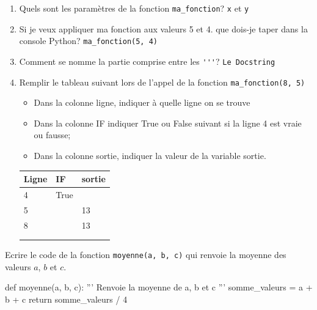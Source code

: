 \documentclass[a4paper,10pt]{report}
\def\ptsexoB{2}
\begin{document}
\begin{enumerate}
    \item Quels sont les paramètres de la fonction \verb|ma_fonction|? \dotfill \verb|x| et \verb|y|
    \item Si je veux appliquer ma fonction aux valeurs 5 et 4. que dois-je taper dans la console Python? \dotfill \verb|ma_fonction(5, 4)|
    \item Comment se nomme la partie comprise entre les \verb|'''|? \dotfill \verb|Le Docstring|
    \item Remplir le tableau suivant lors de l'appel de la fonction \verb|ma_fonction(8, 5)|
    
    \begin{minipage}{0.6\linewidth}
        \begin{itemize}
        \item Dans la colonne ligne, indiquer à quelle ligne on se trouve
        \item Dans la colonne IF indiquer True ou False suivant si la ligne 4 est vraie ou fausse;
        \item Dans la colonne sortie, indiquer la valeur de la variable sortie.
    \end{itemize}
    \end{minipage}
    \begin{minipage}{0.39\linewidth}
         \begin{tabular}{|p{1.5cm}|p{1cm}|p{1.5cm}|}
        \hline
    Ligne & IF & sortie \\ \hline 
    4&True& \\ \hline       
    5&& 13\\ \hline       
    8&& 13\\ \hline       
    && \\ \hline       
    && \\ \hline       
    \end{tabular}
    \end{minipage}

    
   
\end{enumerate}


\bigskip

\exods{\ptsexoB}

Ecrire le code de la fonction \verb|moyenne(a, b, c)| qui renvoie la moyenne des valeurs $a$, $b$ et $c$.


\begin{CodePythontexAlt}[TaillePolice=\large,Largeur=1\linewidth,Centre,PremLigne=1]{}
def moyenne(a, b, c):
    ''' Renvoie la moyenne de a, b et c '''
    somme_valeurs = a + b + c
    return somme_valeurs / 4
\end{CodePythontexAlt}
\end{document}
